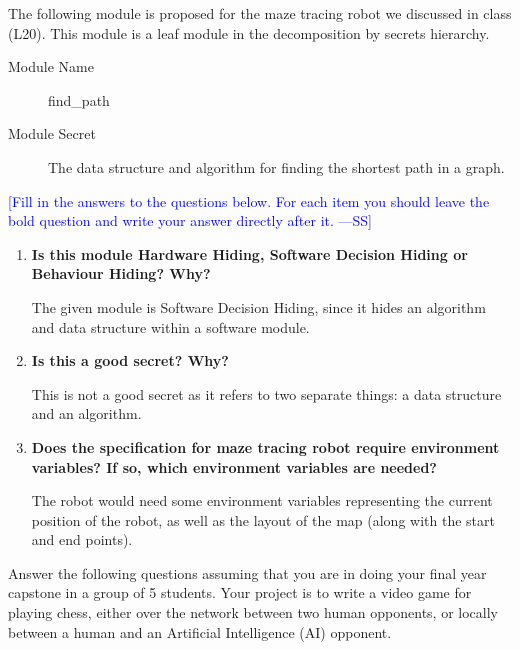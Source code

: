\documentclass[12pt,fleqn]{examtst}
\newcommand{\authornote}[3]{\textcolor{#1}{[#3 ---#2]}}
\newcommand{\authornote}[3]{}
\newcommand{\wss}[1]{\authornote{blue}{SS}{#1}}
\begin{document}

\newpage

 The following module is proposed for the maze tracing robot
we discussed in class (L20).  This module is a leaf module in the decomposition
by secrets hierarchy.

\begin{description}
\item [Module Name] find\_path
\item [Module Secret] The data structure and algorithm for finding the shortest
  path in a graph.
\end{description}

\noindent \wss{Fill in the answers to the questions below.  For each item you
  should leave the bold question and write your answer directly after it.}

\begin{enumerate}
\item \textbf{Is this module Hardware Hiding, Software Decision Hiding or
    Behaviour Hiding?  Why?}

 The given module is Software Decision Hiding, since it hides an algorithm and data structure within a software module.

\item \textbf{Is this a good secret?  Why?}

This is not a good secret as it refers to two separate things: a data structure and an algorithm.

\item \textbf{Does the specification for maze tracing robot require environment
    variables?  If so, which environment variables are needed?}

The robot would need some environment variables representing the current position of the robot, as well as the layout of the map (along with the start and end points).

\end{enumerate}


\newpage

 Answer the following questions assuming that you are in doing
your final year capstone in a group of 5 students.  Your project is to write a
video game for playing chess, either over the network between two human
opponents, or locally between a human and an Artificial Intelligence (AI)
opponent.

\bigskip
\end{document}
